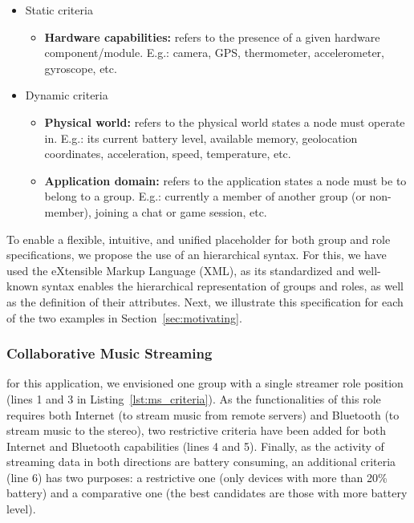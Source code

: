 \begin{itemize}
	
	\item Static criteria
	
	\begin{itemize}
		\item \textbf{Hardware capabilities:} refers to the presence of a given hardware component/module. E.g.: camera, GPS, thermometer, accelerometer, gyroscope, etc.
	\end{itemize}
	
	\item Dynamic criteria
	
	\begin{itemize}
		\item \textbf{Physical world:} refers to the physical world states a node must operate in. E.g.: its current battery level, available memory, geolocation coordinates, acceleration, speed, temperature, etc.
		
		\item \textbf{Application domain:} refers to the application states a node must be to belong to a group. E.g.: currently a member of another group (or non-member), joining a chat or game session, etc.
	\end{itemize}
\end{itemize}



To enable a flexible, intuitive, and unified placeholder for both group and role specifications, we propose the use of an hierarchical syntax. For this, we have used the eXtensible Markup Language (XML), as its standardized and well-known syntax enables the hierarchical representation of groups and roles, as well as the definition of their attributes. Next, we illustrate this specification for each of the two examples in Section~\ref{sec:motivating}.


\subsubsection{Collaborative Music Streaming} for this application, we envisioned one group with a single streamer role position (lines 1 and 3 in Listing~\ref{lst:ms_criteria}). As the functionalities of this role requires both Internet (to stream music from remote servers) and Bluetooth (to stream music to the stereo), two restrictive criteria have been added for both Internet and Bluetooth capabilities (lines 4 and 5). Finally, as the activity of streaming data in both directions are battery consuming, an additional criteria (line 6) has two purposes: a restrictive one (only devices with more than 20\% battery) and a comparative one (the best candidates are those with more battery level).

